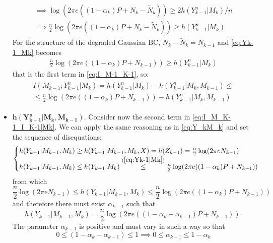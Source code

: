 \begin{itemize}
\begin{align}
\begin{split}
      \implies
      \log(2\pi e ((1-\alpha_k) P+N_k-\tilde{N}_k))\geq 2h(Y^n_{k-1}|M_k)/n\\
      \implies
      \frac{n}{2}\log(2\pi e ((1-\alpha_k) P+N_k-\tilde{N}_k))\geq h(Y^n_{k-1}|M_k)
    \end{split}
    \label{eq:Yk-1_Mk}
  \end{align}
  For the structure of the degraded Gaussian BC, $N_k-\tilde{N}_k=N_{k-1}$ and \ref{eq:Yk-1_Mk} becomes
  \begin{align}
    \frac{n}{2}\log(2\pi e ((1-\alpha_k) P+N_{k-1}))\geq h(Y^n_{k-1}|M_k)
    \label{eq:Yk-1|Mk}
  \end{align}
  that is the first term in \ref{eq:I_M-1_K-1}, so:
  \begin{align}
    \begin{split}
        I(M_{k-1};Y^n_{k-1}|M_k) = h(Y_{k-1}^n|M_{k}) - h(Y_{k-1}^n|M_k,M_{k-1})\leq\\
        \leq \frac{n}{2}\log(2\pi e ((1-\alpha_k) P+N_{k-1})) - h(Y_{k-1}^n|M_k,M_{k-1})
    \end{split}
    \label{eq:final_1}
  \end{align}
  \item $\mathbf{h(Y_{k-1}^n|M_k,M_{k-1})}$. Consider now the second term in \ref{eq:I_M_K-1_I_K-1|Mk}. We can apply the same reasoning as in \ref{eq:Y_kM_k} and set the sequence of disequations:
  \begin{align}
    \begin{cases}
      h(Y_{k-1}|M_{k-1},M_{k})\geq h(Y_{k-1}|M_{k-1},M_{k},X) =h(Z_{k-1}) = \frac{n}{2}\log(2\pi e N_{k-1}) \\
      h(Y_{k-1}|M_{k-1},M_{k})\leq h(Y_{k-1}|M_{k})\overset{(\ref{eq:Yk-1|Mk})}{\leq} \frac{n}{2}\log(2\pi e ((1-\alpha_k) P+N_{k-1}))
    \end{cases}
  \end{align}
  from which
  \begin{equation}
    \frac{n}{2}\log(2\pi e N_{k-1})\leq h(Y_{k-1}|M_{k-1},M_{k})\leq \frac{n}{2}\log(2\pi e ((1-\alpha_k) P+N_{k-1}))
  \end{equation}
  and therefore there must exist $\alpha_{k-1}$ such that
  \begin{equation}
    h(Y_{k-1}|M_{k-1},M_{k}) = \frac{n}{2}\log(2\pi e ((1-\alpha_k-\alpha_{k-1}) P+N_{k-1})).
    \label{eq:final_2}
  \end{equation}
  The parameter $\alpha_{k-1}$ is positive and must vary in such a way so that
  \begin{equation*}
    0\leq(1-\alpha_k-\alpha_{k-1})\leq 1
    \implies 0\leq\alpha_{k-1}\leq 1-\alpha_k
  \end{equation*}
\end{itemize}
